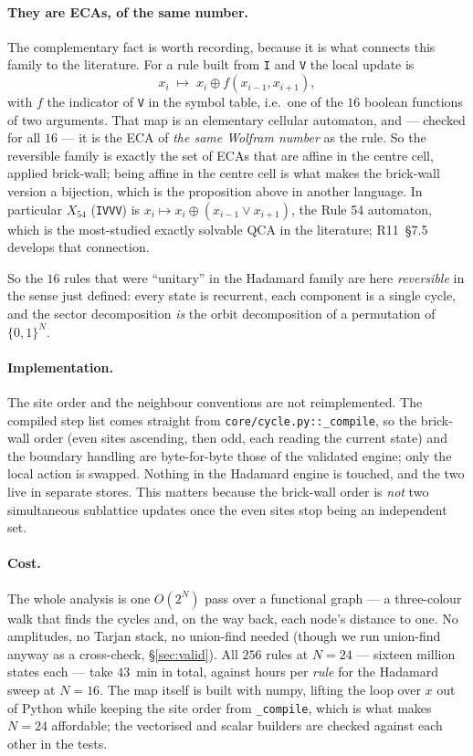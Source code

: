 \documentclass[11pt]{article}
\newcommand{\rt}[1]{\texttt{#1}}
\newcommand{\fn}[1]{\texttt{#1}}
\theoremstyle{plain}
\theoremstyle{definition}
\begin{document}
\paragraph{They are ECAs, of the same number.} The complementary fact is worth
recording, because it is what connects this family to the literature. For a rule
built from \rt{I} and \rt{V} the local update is
\[
x_i \;\longmapsto\; x_i \oplus f(x_{i-1},x_{i+1}),
\]
with $f$ the indicator of \rt{V} in the symbol table, i.e.\ one of the $16$
boolean functions of two arguments. That map is an elementary cellular automaton,
and --- checked for all $16$ --- it is the ECA of \emph{the same Wolfram number} as
the rule. So the reversible family is exactly the set of ECAs that are affine in
the centre cell, applied brick-wall; being affine in the centre cell is what makes
the brick-wall version a bijection, which is the proposition above in another
language. In particular $X_{54}$ (\rt{IVVV}) is
$x_i\mapsto x_i\oplus(x_{i-1}\vee x_{i+1})$, the Rule 54 automaton, which is the
most-studied exactly solvable QCA in the literature; R11~\S7.5 develops that
connection.

\noindent So the $16$ rules that were ``unitary'' in the Hadamard family are here
\emph{reversible} in the sense just defined: every state is recurrent, each
component is a single cycle, and the sector decomposition \emph{is} the orbit
decomposition of a permutation of $\{0,1\}^N$.

\paragraph{Implementation.} The site order and the neighbour conventions are not
reimplemented. The compiled step list comes straight from
\fn{core/cycle.py::\_compile}, so the brick-wall order (even sites ascending,
then odd, each reading the current state) and the boundary handling are
byte-for-byte those of the validated engine; only the local action is swapped.
Nothing in the Hadamard engine is touched, and the two live in separate stores.
This matters because the brick-wall order is \emph{not} two simultaneous
sublattice updates once the even sites stop being an independent set.

\paragraph{Cost.} The whole analysis is one $O(2^N)$ pass over a functional
graph --- a three-colour walk that finds the cycles and, on the way back, each
node's distance to one. No amplitudes, no Tarjan stack, no union-find needed
(though we run union-find anyway as a cross-check, \S\ref{sec:valid}). All $256$ rules at $N=24$
--- sixteen million states each --- take $43$~min in total, against hours per
\emph{rule} for the Hadamard sweep at $N=16$. The map itself is built with numpy,
lifting the loop over $x$ out of Python while keeping the site order from
\fn{\_compile}, which is what makes $N=24$ affordable; the vectorised and scalar
builders are checked against each other in the tests.
\end{document}
